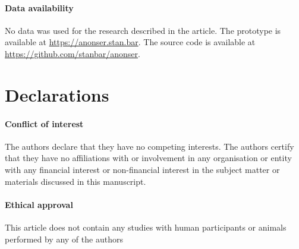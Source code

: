\documentclass[pdftex,twocolumn,epjc3]{svjour3}
\begin{document}
\paragraph{Data availability}
No data was used for the research described in the article.
The prototype is available at \url{https://anonser.stan.bar}. 
The source code is available at \url{https://github.com/stanbar/anonser}.

\section*{Declarations}

\paragraph{Conflict of interest} The authors declare that they have no competing interests. The authors certify that they have no affiliations with or involvement in any organisation or entity with any financial interest or non-financial interest in the subject matter or materials discussed in this manuscript.

\paragraph{Ethical approval} This article does not contain any studies with human participants or animals performed by any of the authors


\appendix
\end{document}
